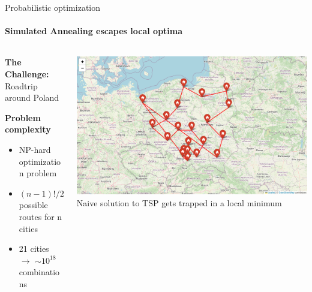 \documentclass{beamer}
\begin{document}
\begin{frame}{Probabilistic optimization}
  \framesubtitle{Simulated Annealing escapes local optima}
  \begin{columns}[c]
    \begin{column}{0.4\textwidth}
      \textbf{The Challenge:} Roadtrip around Poland
      \vspace{0.5cm}

      \textbf{Problem complexity}
      \begin{itemize}
        \item NP-hard optimization problem
        \item $(n-1)!/2$ possible routes for n cities
        \item 21 cities $\to$ $\sim10^{18}$ combinations
      \end{itemize}
    \end{column}
    \begin{column}{0.6\textwidth}
      \begin{center}
        \includegraphics[width=\textwidth]{images/tsp-naive.png}
        \\[0.2cm]
        \small{Naive solution to TSP gets trapped in a local minimum}
      \end{center}
    \end{column}
  \end{columns}
\end{frame}
\end{document}
